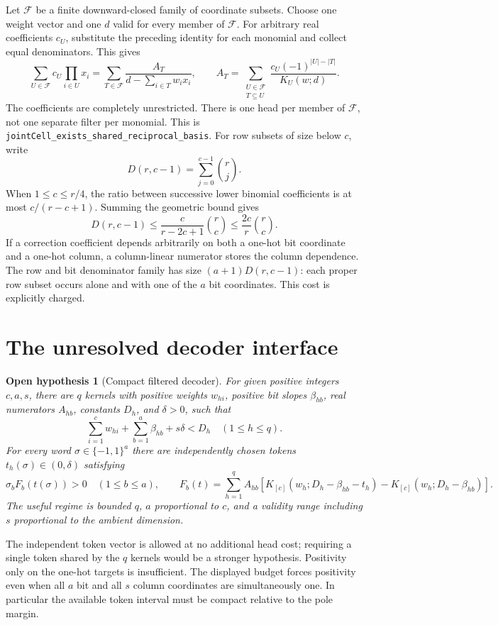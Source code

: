 \documentclass[11pt]{article}
\newtheorem{hypothesis}{Open hypothesis}
\begin{document}
Let $\mathcal F$ be a finite downward-closed family of coordinate subsets.
Choose one weight vector and one $d$ valid for every member of $\mathcal F$.
For arbitrary real coefficients $c_U$, substitute the preceding identity
for each monomial and collect equal denominators. This gives
\[
 \sum_{U\in\mathcal F}c_U\prod_{i\in U}x_i
 =\sum_{T\in\mathcal F}
 \frac{A_T}{d-\sum_{i\in T}w_i x_i},\qquad
 A_T=\sum_{\substack{U\in\mathcal F\\T\subseteq U}}
 \frac{c_U(-1)^{|U|-|T|}}{K_U(w;d)}.
\]
The coefficients are completely unrestricted. There is one head per
member of $\mathcal F$, not one separate filter per monomial.
This is \texttt{jointCell\_exists\_shared\_reciprocal\_basis}.
For row subsets of size below $c$, write
\[
 D(r,c-1)=\sum_{j=0}^{c-1}\binom rj.
\]
When $1\le c\le r/4$, the ratio between successive lower binomial
coefficients is at most $c/(r-c+1)$. Summing the geometric bound gives
\[
 D(r,c-1)\le\frac{c}{r-2c+1}\binom rc
 \le\frac{2c}{r}\binom rc.
\]
If a correction coefficient depends arbitrarily on both a one-hot bit
coordinate and a one-hot column, a column-linear numerator stores the
column dependence. The row and bit denominator family has size
$(a+1)D(r,c-1)$: each proper row subset occurs alone and with one of the
$a$ bit coordinates. This cost is explicitly charged.

\section{The unresolved decoder interface}

\begin{hypothesis}[Compact filtered decoder]
For given positive integers $c,a,s$, there are $q$ kernels with positive
weights $w_{hi}$, positive bit slopes $\beta_{hb}$, real numerators
$A_{hb}$, constants $D_h$, and $\delta>0$, such that
\[
 \sum_{i=1}^c w_{hi}+\sum_{b=1}^a\beta_{hb}+s\delta<D_h
 \quad(1\le h\le q).
\]
For every word $\sigma\in\{-1,1\}^a$ there are independently chosen
tokens $t_h(\sigma)\in(0,\delta)$ satisfying
\[
 \sigma_b F_b(t(\sigma))>0\quad(1\le b\le a),
 \qquad
 F_b(t)=\sum_{h=1}^q A_{hb}
 \left[K_{[c]}(w_h;D_h-\beta_{hb}-t_h)
       -K_{[c]}(w_h;D_h-\beta_{hb})\right].
\]
The useful regime is bounded $q$, $a$ proportional to $c$, and a validity
range including $s$ proportional to the ambient dimension.
\end{hypothesis}

The independent token vector is allowed at no additional head cost;
requiring a single token shared by the $q$ kernels would be a stronger
hypothesis. Positivity only on the one-hot targets is insufficient.
The displayed budget forces positivity even when all $a$ bit and all
$s$ column coordinates are simultaneously one. In particular the
available token interval must be compact relative to the pole margin.
\end{document}

